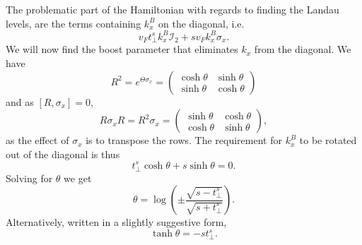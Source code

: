 The problematic part of the Hamiltonian with regards to finding the Landau levels, are the terms containing \(k^B_{x}\) on the diagonal, i.e.
\[
  v_F t^s_{\perp} k^B_{x} \mathcal{I}_{2} + s v_{F} k^B_{x} \sigma _{x}.
\]
We will now find the boost parameter that eliminates \(k_{x}\) from the diagonal.
We have
\begin{equation}
  \label{eq:33}
  R^{2} = e^{\Theta \sigma _{x} } =
  \begin{pmatrix}
    \cosh \theta & \sinh \theta \\
    \sinh \theta & \cosh \theta
  \end{pmatrix}
\end{equation}
and as $[R, \sigma_{x}] = 0$,
\begin{equation}
  \label{eq:34}
  R \sigma _{x} R =  R^{2} \sigma _{x} =
  \begin{pmatrix}
    \sinh \theta & \cosh \theta \\
    \cosh \theta & \sinh \theta
  \end{pmatrix},
\end{equation}
as the effect of \(\sigma _{x}\) is to transpose the rows.
The requirement for \(k^B_{x}\) to be rotated out of the diagonal is thus
\begin{equation}
  \label{eq:35}
  t^s_{\perp} \cosh \theta + s \sinh \theta = 0.
\end{equation}
Solving for \(\theta \) we get
\begin{equation}
  \label{eq:36}
  \theta = \log (
  \pm \frac{\sqrt{s - t^s_{\perp}}}{\sqrt{s + t^s_{\perp}}}
  ).
\end{equation}
Alternatively, written in a slightly suggestive form,
\begin{equation}
  \label{eq:37}
  \tanh \theta =
  - s t^s_{\perp}.
\end{equation}

